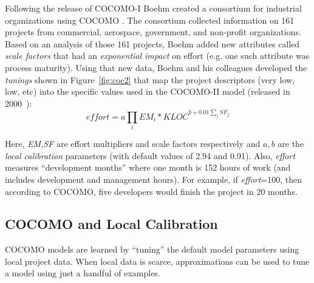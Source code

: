 \documentclass[smallcondesed]{svjour3}
\newcommand{\fig}[1]{Figure~\ref{fig:#1}}
\begin{document}
Following the release of COCOMO-I Boehm created a consortium for
industrial organizations using COCOMO .
The consortium
collected information on 161 projects from commercial,
aerospace, government, and non-profit organizations.
Based on an analysis of those 161 projects, Boehm
 added  new attributes called {\em scale factors}
that had an {\em exponential impact}
on effort (e.g. one such attribute was process maturity).
Using that new data, Boehm and his colleagues developed
the  {\em tunings} shown in \fig{coc2} that
map the project descriptors (very low, low, etc)
into the specific values used in the COCOMO-II model
(released in 2000~\cite{boehm00b}):
\begin{equation}\label{eq:cocII}
\mathit{effort}=a\prod_i EM_i *\mathit{KLOC}^{b+0.01\sum_j SF_j}
\end{equation}

Here, {\em EM,SF} are  effort multipliers and scale
factors respectively and
 $a,b$ are the {\em local calibration} parameters (with default values of 2.94 and 0.91).
Also, {\em effort}
measures ``development months'' where one month
is 152 hours of work  (and includes development and management hours).
For example, if {\em effort}=100, then according to COCOMO,
five developers would finish
the project in 20 months.







 
\subsection{COCOMO and Local Calibration}\label{sect:coconut}
COCOMO models are learned by ``tuning''
  the default model parameters using local
  project data.
When local data is scarce, approximations can be used to
tune a model using just a handful of examples.  
\end{document}
